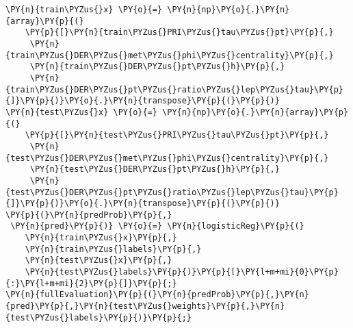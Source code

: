 {\par%
\vspace{-1\baselineskip}%
}%
\begin{notebookcell}[]%
\begin{addmargin}[\cellleftmargin]{0em}%
{\smaller%
\par%
%
\vspace{-1\smallerfontscale}%
\begin{Verbatim}[commandchars=\\\{\}]
\PY{n}{train\PYZus{}x} \PY{o}{=} \PY{n}{np}\PY{o}{.}\PY{n}{array}\PY{p}{(}
    \PY{p}{[}\PY{n}{train\PYZus{}PRI\PYZus{}tau\PYZus{}pt}\PY{p}{,}
     \PY{n}{train\PYZus{}DER\PYZus{}met\PYZus{}phi\PYZus{}centrality}\PY{p}{,}
     \PY{n}{train\PYZus{}DER\PYZus{}pt\PYZus{}h}\PY{p}{,}
     \PY{n}{train\PYZus{}DER\PYZus{}pt\PYZus{}ratio\PYZus{}lep\PYZus{}tau}\PY{p}{]}\PY{p}{)}\PY{o}{.}\PY{n}{transpose}\PY{p}{(}\PY{p}{)}
\PY{n}{test\PYZus{}x} \PY{o}{=} \PY{n}{np}\PY{o}{.}\PY{n}{array}\PY{p}{(}
    \PY{p}{[}\PY{n}{test\PYZus{}PRI\PYZus{}tau\PYZus{}pt}\PY{p}{,}
     \PY{n}{test\PYZus{}DER\PYZus{}met\PYZus{}phi\PYZus{}centrality}\PY{p}{,}
     \PY{n}{test\PYZus{}DER\PYZus{}pt\PYZus{}h}\PY{p}{,}
     \PY{n}{test\PYZus{}DER\PYZus{}pt\PYZus{}ratio\PYZus{}lep\PYZus{}tau}\PY{p}{]}\PY{p}{)}\PY{o}{.}\PY{n}{transpose}\PY{p}{(}\PY{p}{)}
\PY{p}{(}\PY{n}{predProb}\PY{p}{,}
 \PY{n}{pred}\PY{p}{)} \PY{o}{=} \PY{n}{logisticReg}\PY{p}{(}
    \PY{n}{train\PYZus{}x}\PY{p}{,}
    \PY{n}{train\PYZus{}labels}\PY{p}{,}
    \PY{n}{test\PYZus{}x}\PY{p}{,}
    \PY{n}{test\PYZus{}labels}\PY{p}{)}\PY{p}{[}\PY{l+m+mi}{0}\PY{p}{:}\PY{l+m+mi}{2}\PY{p}{]}\PY{p}{;}
\PY{n}{fullEvaluation}\PY{p}{(}\PY{n}{predProb}\PY{p}{,}\PY{n}{pred}\PY{p}{,}\PY{n}{test\PYZus{}weights}\PY{p}{,}\PY{n}{test\PYZus{}labels}\PY{p}{)}\PY{p}{;}
\end{Verbatim}
%
\par%
\vspace{-1\smallerfontscale}}%
\end{addmargin}
\end{notebookcell}

